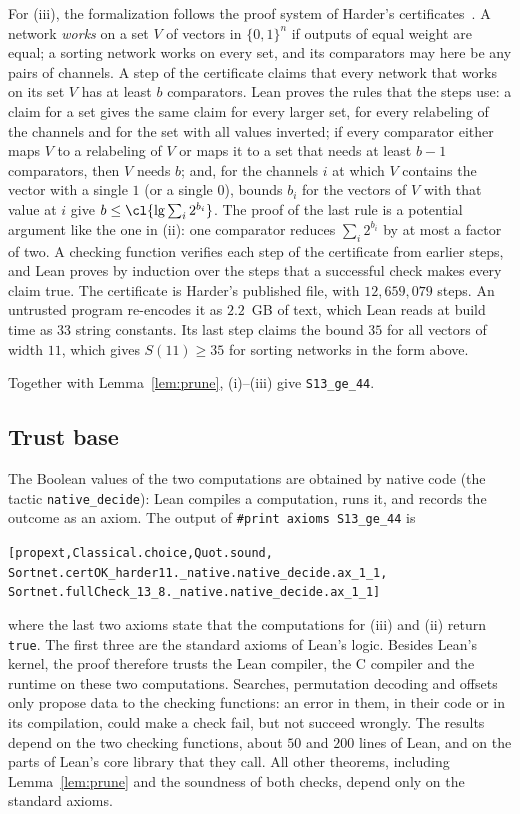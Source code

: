 For (iii), the formalization follows the proof system of Harder's certificates~\cite{Har22}. A network
\emph{works} on a set $V$ of vectors in $\{0,1\}^n$ if outputs of equal weight are equal; a sorting network
works on every set, and its comparators may here be any pairs of channels. A step of the certificate claims
that every network that works on its set $V$ has at least $b$ comparators. Lean proves the rules that the
steps use: a claim for a set gives the same claim for every larger set, for every relabeling of the channels
and for the set with all values inverted; if every comparator either maps $V$ to a relabeling of $V$ or maps
it to a set that needs at least $b-1$ comparators, then $V$ needs $b$; and, for the channels $i$ at which
$V$ contains the vector with a single $1$ (or a single $0$), bounds $b_i$ for the vectors of $V$ with that
value at $i$ give $b\le\cl{\lg\sum_i2^{b_i}}$. The proof of the last rule is a potential argument like the
one in (ii): one comparator reduces $\sum_i2^{b_i}$ by at most a factor of two. A checking function verifies
each step of the certificate from earlier steps, and Lean proves by induction over the steps that a
successful check makes every claim true. The certificate is Harder's published file, with
$12{,}659{,}079$ steps. An untrusted program re-encodes it as $2.2$~GB of text, which Lean reads at build
time as $33$ string constants. Its last step claims the bound $35$ for all vectors of width $11$, which
gives $S(11)\ge35$ for sorting networks in the form above.

Together with Lemma~\ref{lem:prune}, (i)--(iii) give \texttt{S13\_ge\_44}.

\subsection{Trust base}
The Boolean values of the two computations are obtained by native code (the tactic
\texttt{native\_decide}): Lean compiles a computation, runs it, and records the outcome as an axiom. The output
of \texttt{\#print axioms S13\_ge\_44} is
\begin{alltt}\small
[propext, Classical.choice, Quot.sound,
 Sortnet.certOK_harder11._native.native_decide.ax_1_1,
 Sortnet.fullCheck_13_8._native.native_decide.ax_1_1]
\end{alltt}
where the last two axioms state that the computations for (iii) and (ii) return \texttt{true}. The first three
are the standard axioms of Lean's logic. Besides Lean's kernel, the proof therefore trusts the Lean compiler,
the C compiler and the runtime on these two computations. Searches, permutation decoding and offsets only
propose data to the checking functions: an error in them, in their code or in its compilation, could make a
check fail, but not succeed wrongly. The results depend on the two checking functions, about $50$ and $200$
lines of Lean, and on the parts of Lean's core library that they call. All other theorems, including
Lemma~\ref{lem:prune} and the soundness of both checks, depend only on the standard axioms.

